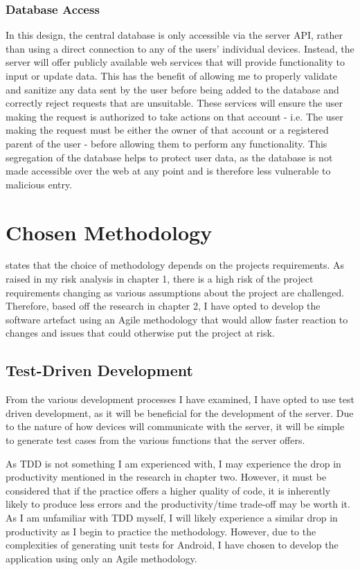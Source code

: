 \subsubsection{Database Access}
In this design, the central database is only accessible via the server API, rather than using a direct connection to any of the users' individual devices.
Instead, the server will offer publicly available web services that will provide functionality to input or update data. 
This has the benefit of allowing me to properly validate and sanitize any data sent by the user before being added to the database and correctly reject requests that are unsuitable. 
These services will ensure the user making the request is authorized to take actions on that account - i.e. The user making the request must be either the owner of that account or a registered parent of the user - before allowing them to perform any functionality.
This segregation of the database helps to protect user data, as the database is not made accessible over the web at any point and is therefore less vulnerable to malicious entry.

\section{Chosen Methodology}
\cite{balaji2012waterfall} states that the choice of methodology depends on the projects requirements.
As raised in my risk analysis in chapter 1, there is a high risk of the project requirements changing as various assumptions about the project are challenged.
Therefore, based off the research in chapter 2, I have opted to develop the software artefact using an Agile methodology that would allow faster reaction to changes and issues that could otherwise put the project at risk.

\subsection{Test-Driven Development}
From the various development processes I have examined, I have opted to use test driven development, as it will be beneficial for the development of the server.
Due to the nature of how devices will communicate with the server, it will be simple to generate test cases from the various functions that the server offers.

As TDD is not something I am experienced with, I may experience the drop in productivity mentioned in the research in chapter two.
However, it must be considered that if the practice offers a higher quality of code, it is inherently likely to produce less errors and the productivity/time trade-off may be worth it.
As I am unfamiliar with TDD myself, I will likely experience a similar drop in productivity as I begin to practice the methodology.
However, due to the complexities of generating unit tests for Android, I have chosen to develop the application using only an Agile methodology.

